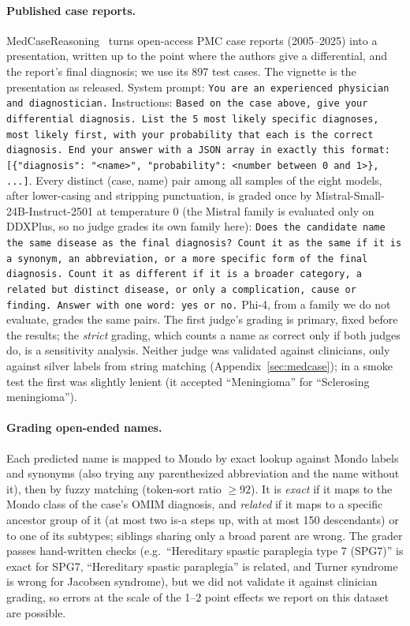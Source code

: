 \documentclass[wcp]{jmlr}
\begin{document}
\paragraph{Published case reports.} MedCaseReasoning~\citep{wu2025medcasereasoning} turns open-access PMC case reports (2005--2025) into a presentation, written up to the point where the authors give a differential, and the report's final diagnosis; we use its 897 test cases. The vignette is the presentation as released. System prompt: \texttt{You are an experienced physician and diagnostician.} Instructions: \texttt{Based on the case above, give your differential diagnosis. List the 5 most likely specific diagnoses, most likely first, with your probability that each is the correct diagnosis. End your answer with a JSON array in exactly this format: [\{"diagnosis": "<name>", "probability": <number between 0 and 1>\}, ...]}. Every distinct (case, name) pair among all samples of the eight models, after lower-casing and stripping punctuation, is graded once by Mistral-Small-24B-Instruct-2501 at temperature 0 (the Mistral family is evaluated only on DDXPlus, so no judge grades its own family here): \texttt{Does the candidate name the same disease as the final diagnosis? Count it as the same if it is a synonym, an abbreviation, or a more specific form of the final diagnosis. Count it as different if it is a broader category, a related but distinct disease, or only a complication, cause or finding. Answer with one word: yes or no.} Phi-4, from a family we do not evaluate, grades the same pairs. The first judge's grading is primary, fixed before the results; the \emph{strict} grading, which counts a name as correct only if both judges do, is a sensitivity analysis. Neither judge was validated against clinicians, only against silver labels from string matching (Appendix~\ref{sec:medcase}); in a smoke test the first was slightly lenient (it accepted ``Meningioma'' for ``Sclerosing meningioma'').
\paragraph{Grading open-ended names.} Each predicted name is mapped to Mondo by exact lookup against Mondo labels and synonyms (also trying any parenthesized abbreviation and the name without it), then by fuzzy matching (token-sort ratio $\geq 92$). It is \emph{exact} if it maps to the Mondo class of the case's OMIM diagnosis, and \emph{related} if it maps to a specific ancestor group of it (at most two is-a steps up, with at most 150 descendants) or to one of its subtypes; siblings sharing only a broad parent are wrong. The grader passes hand-written checks (e.g.\ ``Hereditary spastic paraplegia type 7 (SPG7)'' is exact for SPG7, ``Hereditary spastic paraplegia'' is related, and Turner syndrome is wrong for Jacobsen syndrome), but we did not validate it against clinician grading, so errors at the scale of the 1--2 point effects we report on this dataset are possible.
\end{document}
